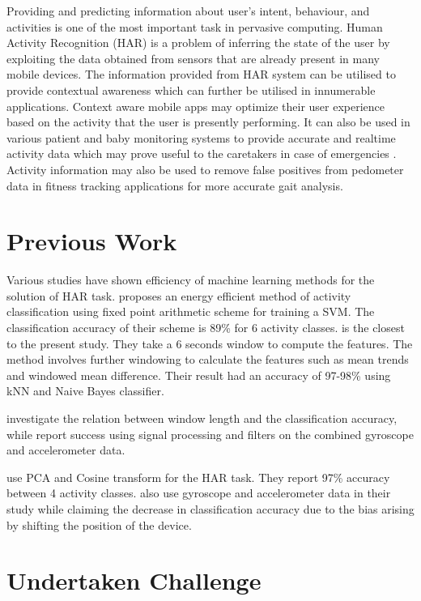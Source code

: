 \documentclass[5p]{elsarticle}
\begin{document}
Providing and predicting information about user's intent, behaviour, and activities is one of the most important task in pervasive computing. Human Activity Recognition (\gls{HAR}) is a problem of inferring the state of the user by exploiting the data obtained from sensors that are already present in many mobile devices. The information provided from \gls{HAR} system can be utilised to provide contextual awareness which can further be utilised in innumerable applications. Context aware mobile apps may optimize their user experience based on the activity that the user is presently performing. It can also be used in various patient and baby monitoring systems to provide accurate and realtime activity data which may prove useful to the caretakers in case of emergencies \cite{Anguita2013}. Activity information may also be used to remove false positives from pedometer data in fitness tracking applications for more accurate gait analysis.

\section{Previous Work}

Various studies have shown efficiency of machine learning methods for the solution of \gls{HAR} task. \cite{Anguita2013} proposes an energy efficient method of activity classification using fixed point arithmetic scheme for training a \gls{SVM}. The classification accuracy of their scheme is 89\% for 6 activity classes. \cite{Gupta2014} is the closest to the present study. They take a 6 seconds window to compute the features. The method involves further windowing to calculate the features such as mean trends and windowed mean difference. Their result had an accuracy of 97-98\% using kNN and Naive Bayes classifier.

\cite{Banos2014} investigate the relation between window length and the classification accuracy, while \cite{Reyes-Ortiz2015} report success using signal processing and filters on the combined gyroscope and accelerometer data.

\cite{He2009} use PCA and Cosine transform for the \gls{HAR} task. They report 97\% accuracy between 4 activity classes. \cite{Shoaib2013} also use gyroscope and accelerometer data in their study while claiming the decrease in classification accuracy due to the bias arising by shifting the position of the device.

\section{Undertaken Challenge}
\end{document}
